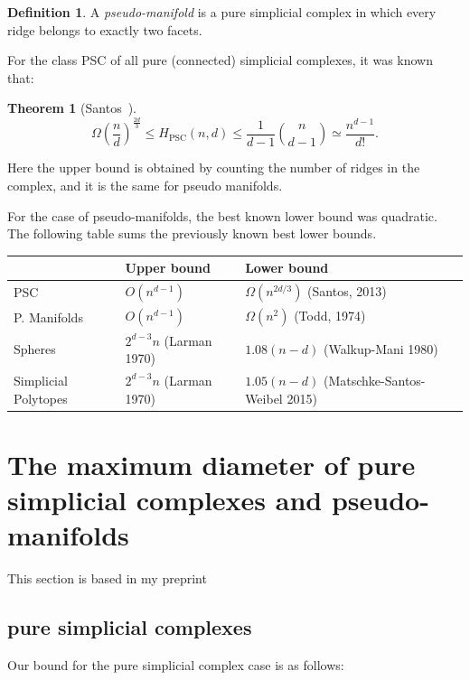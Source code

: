 \documentclass[12pt,a4paper]{article}
\newcommand{\PSC}{{\textrm{PSC}}}
\theoremstyle{plain}
\newtheorem{theorem}{Theorem}
\theoremstyle{definition}
\newtheorem{definition}{Definition}
\begin{document}
\begin{definition}
  A \emph{pseudo-manifold} is a pure simplicial complex in which every ridge belongs to exactly two facets.
\end{definition}

For the class PSC of all pure (connected) simplicial complexes, it was known that:

\begin{theorem}[Santos~]
\label{thm:Santosbound}
\[
  \Omega\left(\frac{n}{d}\right)^{\frac{2d}{3}} \le H_{\PSC}(n,d) \le \frac{1}{d-1}\binom{n}{d-1}\simeq \frac{n^{d-1}}{d!}.
\]
\end{theorem}

Here the upper bound is obtained by counting the number of ridges in the complex, and it is the same for pseudo manifolds.

For the case of pseudo-manifolds, the best known lower bound was quadratic. The following table sums the previously known best lower bounds.

\begin{center}
\begin{tabular}{p{2cm}|p{4cm}|p{4cm}|}
  &Upper bound & Lower bound \\ \hline
  PSC & $O(n^{d-1})$ & $\Omega(n^{2d/3})$ \newline (Santos, 2013) \\\hline
  P. Manifolds & $O(n^{d-1})$& $\Omega(n^2)$ \newline (Todd, 1974)\\\hline
  Spheres & $2^{d-3}n $ \newline(Larman 1970) & $1.08(n-d)$ \newline(Walkup-Mani 1980) \\\hline
  Simplicial Polytopes & $2^{d-3}n$ \newline(Larman 1970) & $1.05(n-d)$ \newline(Matschke-Santos-Weibel 2015) \\\hline
\end{tabular}
\end{center}

\section{The maximum diameter of pure simplicial complexes and pseudo-manifolds}
\label{sec:mypaper}
This section is based in my preprint~\cite{mypaper}

\subsection{pure simplicial complexes}
Our bound for the pure simplicial complex case is as follows:
\end{document}
